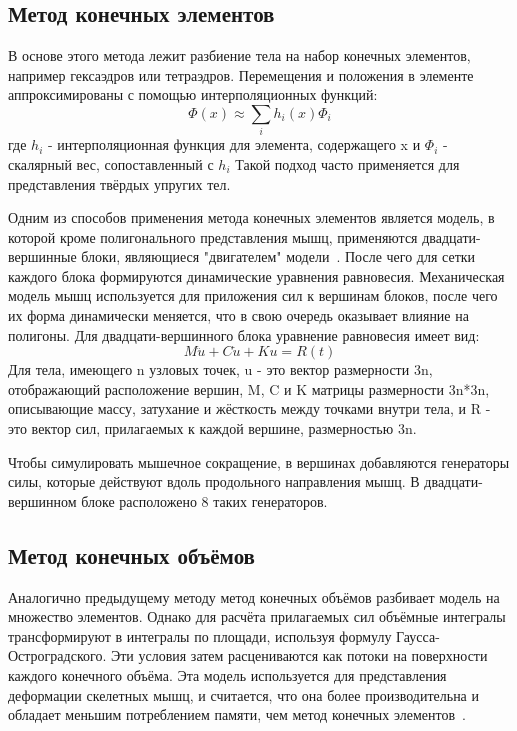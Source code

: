 \subsection{Метод конечных элементов}
\label{subsec:FEM}
В основе этого метода лежит разбиение тела на набор конечных элементов, например гексаэдров или тетраэдров. Перемещения и положения в элементе аппроксимированы с помощью интерполяционных функций:
\begin{equation}\label{eq:FEM}
\Phi(x)\approx\sum_{i}h_{i}(x)\Phi_{i}
\end{equation}
где $h_{i}$ - интерполяционная функция для элемента, содержащего x и $\Phi_{i}$ - скалярный вес, сопоставленный с $h_{i}$ Такой подход часто применяется для представления твёрдых упругих тел. \par Одним из способов применения метода конечных элементов является модель, в которой кроме полигонального представления мышц, применяются двадцати-вершинные блоки, являющиеся "двигателем" модели~\cite{chen}. После чего для сетки каждого блока формируются динамические уравнения равновесия. Механическая модель мышц используется для приложения сил к вершинам блоков,  после чего их форма динамически меняется, что в свою очередь оказывает влияние на полигоны. Для двадцати-вершинного блока уравнение равновесия имеет вид:
\begin{equation}\label{key}
M\ddot{u}+C\dot{u}+Ku=R(t)
\end{equation}
Для тела, имеющего n узловых точек, u - это вектор размерности 3n, отображающий расположение вершин, M, C и K матрицы размерности 3n*3n, описывающие массу, затухание и жёсткость между точками внутри тела, и R - это вектор сил, прилагаемых к каждой вершине, размерностью 3n.
\par Чтобы симулировать мышечное сокращение, в вершинах добавляются генераторы силы, которые действуют вдоль продольного направления мышц. В двадцати-вершинном блоке расположено 8 таких генераторов.

\subsection{Метод конечных объёмов}
\label{subsec:FVM}
Аналогично предыдущему методу метод конечных объёмов разбивает модель на множество элементов. Однако для расчёта прилагаемых сил объёмные интегралы трансформируют в интегралы по площади, используя формулу Гаусса-Остроградского. Эти условия затем расцениваются как потоки на поверхности каждого конечного объёма. Эта модель используется для представления деформации скелетных мышц, и считается, что она более производительна и обладает меньшим потреблением памяти, чем метод конечных элементов~\cite{teran}.
